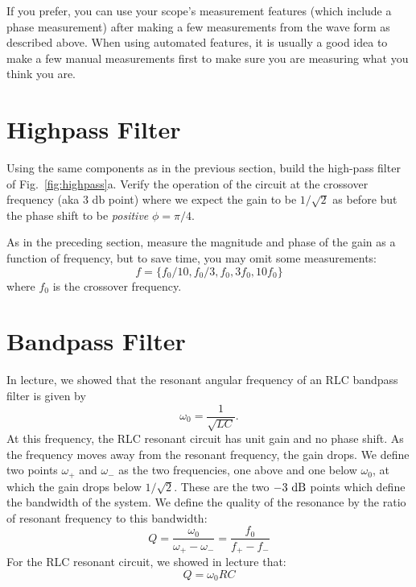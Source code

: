 If you prefer, you can use your scope's measurement features (which include a phase measurement) after making a few measurements from the wave form as described above.  When using automated features, it is usually a good idea to make a few manual measurements first to make sure you are measuring what you think you are.

\section{Highpass Filter}

Using the same components as in the previous section, build the high-pass filter of Fig.~\ref{fig:highpass}a.  Verify the operation of the circuit at the crossover frequency (aka 3 db point) where we expect the gain to be $1/\sqrt{2}$ as before but the phase shift to be {\em positive} $\phi = \pi/4$.

As in the preceding section, measure the magnitude and phase of the gain as a function of frequency, but to save time, you may omit some measurements:
\begin{displaymath}
f=\{f_0/10, f_0/3,f_0, 3f_0, 10f_0\}
\end{displaymath}
where $f_0$ is the crossover frequency.

\section{Bandpass Filter}


In lecture, we showed that the resonant angular frequency of an RLC bandpass filter is given by
\begin{equation}
\omega_0 = \frac{1}{\sqrt{LC}}. 
\end{equation}
At this frequency, the RLC resonant circuit has unit gain and no phase shift.  As the frequency moves away from the resonant frequency, the gain drops.  We define two points $\omega_+$ and $\omega_-$ as the two frequencies, one above and one below $\omega_0$, at which the gain drops below $1/\sqrt{2}$.  These are the two $-3~\rm dB$ points which define the bandwidth of the system.  We define the quality of the resonance by the ratio of resonant frequency to this bandwidth:
\begin{displaymath}
Q = \frac{\omega_0}{\omega_+ - \omega_-} = \frac{f_0}{f_+-f_-}
\end{displaymath}
For the RLC resonant circuit, we showed in lecture that:
\begin{equation}
Q = \omega_0 RC
\end{equation}

